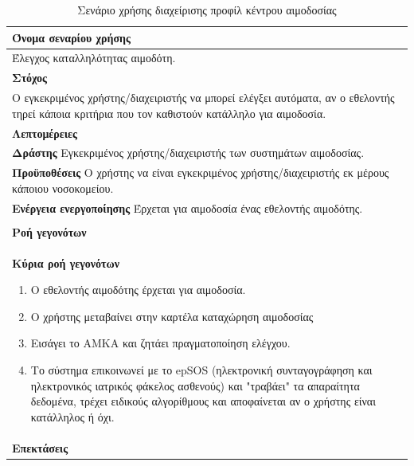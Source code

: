 \begin{table}[H]
	\begin{center}
	    \begin{tabular}{|p{\dimexpr \linewidth-2\tabcolsep}|}
	    \hline
	    \rowcolor{grayy}
	    \textbf{Όνομα σεναρίου χρήσης}
	    \\ \hline    
	    Έλεγχος καταλληλότητας αιμοδότη.
	     \\ \hline
	    \rowcolor{grayy}
	    \textbf{\textbf{Στόχος}}
	    \\ \hline
	 	 Ο εγκεκριμένος χρήστης/διαχειριστής να μπορεί ελέγξει αυτόματα, αν ο εθελοντής τηρεί κάποια κριτήρια που τον καθιστούν κατάλληλο για αιμοδοσία. 
	    \\ \hline
	    \rowcolor{grayy}
	    \textbf{Λεπτομέρειες}
	    \\ \hline
		\textbf{Δράστης} Εγκεκριμένος χρήστης/διαχειριστής των συστημάτων αιμοδοσίας.
		\\*
		\textbf{Προϋποθέσεις} Ο χρήστης να είναι εγκεκριμένος χρήστης/διαχειριστής εκ μέρους κάποιου νοσοκομείου.
		\\*
		\textbf{Ενέργεια ενεργοποίησης} Έρχεται για αιμοδοσία ένας εθελοντής αιμοδότης.
		\\ \hline
	    \\ \hline
		\rowcolor{grayy}    
	    \textbf{Ροή γεγονότων}
	    \\* 
		\textbf{Κύρια ροή γεγονότων}
		\begin{enumerate}
			\item	 Ο εθελοντής αιμοδότης έρχεται για αιμοδοσία.
			\item Ο χρήστης μεταβαίνει στην καρτέλα καταχώρηση αιμοδοσίας
			\item Εισάγει το ΑΜΚΑ και ζητάει πραγματοποίηση ελέγχου.
			\item Το σύστημα επικοινωνεί με το epSOS (ηλεκτρονική συνταγογράφηση και ηλεκτρονικός ιατρικός φάκελος ασθενούς) και "τραβάει" τα απαραίτητα δεδομένα, τρέχει ειδικούς αλγορίθμους και αποφαίνεται αν ο χρήστης είναι κατάλληλος ή όχι.
		\end{enumerate}
		\\*
		\textbf{Επεκτάσεις}
		   \\ \hline
	    \end{tabular}
	    \caption{Σενάριο χρήσης διαχείρισης προφίλ κέντρου αιμοδοσίας}
	    \label{tab:check_donor_eligibility}
	\end{center}
\end{table}	


